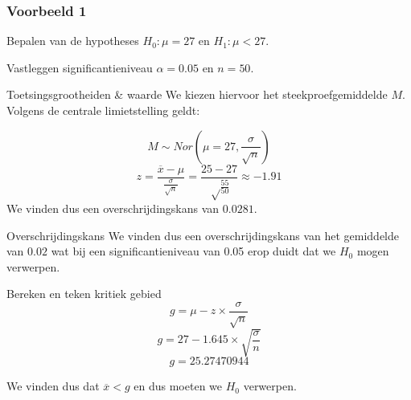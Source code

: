 \documentclass{beamer}
\begin{document}
\begin{frame}
  \frametitle{Voorbeeld 1}
  \begin{block}{Bepalen van de hypotheses}
    $H_{0} : \mu = 27$ en $H_{1}: \mu < 27$.
  \end{block}


  \begin{block}{Vastleggen significantieniveau}
  $\alpha = 0.05$ en $n=50$.
  \end{block}


  \begin{block}{Toetsingsgrootheiden \& waarde}
  We kiezen hiervoor het steekproefgemiddelde $M$. Volgens de centrale limietstelling geldt:

  \[ M \sim Nor(\mu = 27, \frac{\sigma}{\sqrt{n}}) \]
  \[ z = \frac{\overline{x} - \mu}{\frac{\sigma}{\sqrt{n}}} = \frac{25-27}{\sqrt\frac{55}{50}} \approx -1.91\]
  We vinden dus een overschrijdingskans van $0.0281$.
  \end{block}
  \end{frame}

\begin{frame}
    \begin{block}{Overschrijdingskans}
    We vinden dus een overschrijdingskans van het gemiddelde van $0.02$ wat bij een significantieniveau van 0.05 erop duidt dat we $H_{0}$ mogen verwerpen.
    \end{block}

    \begin{block}{Bereken en teken kritiek gebied}
    \[ g = \mu - z \times \frac{\sigma}{\sqrt{n}} \]
    \[ g = 27 - 1.645 \times \sqrt{\frac{\sigma}{n}} \]
    \[ g = 25.27470944 \]

    We vinden dus dat $\overline{x} < g$ en dus moeten we $H_{0}$ verwerpen.
\end{block}

\end{frame}

\begin{frame}
    \centering
\end{frame}
\end{document}
